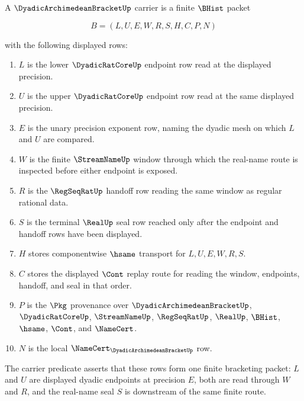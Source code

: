 \begin{definition}
\label{def:dyadic-archimedean-bracket-carrier}
A $\DyadicArchimedeanBracketUp$ carrier is a finite $\BHist$ packet

$$
B=(L,U,E,W,R,S,H,C,P,N)
$$

with the following displayed rows:
\begin{enumerate}
\item $L$ is the lower $\DyadicRatCoreUp$ endpoint row read at the displayed precision.
\item $U$ is the upper $\DyadicRatCoreUp$ endpoint row read at the same displayed precision.
\item $E$ is the unary precision exponent row, naming the dyadic mesh on which $L$ and $U$ are compared.
\item $W$ is the finite $\StreamNameUp$ window through which the real-name route is inspected before either endpoint is exposed.
\item $R$ is the $\RegSeqRatUp$ handoff row reading the same window as regular rational data.
\item $S$ is the terminal $\RealUp$ seal row reached only after the endpoint and handoff rows have been displayed.
\item $H$ stores componentwise $\hsame$ transport for $L,U,E,W,R,S$.
\item $C$ stores the displayed $\Cont$ replay route for reading the window, endpoints, handoff, and seal in that order.
\item $P$ is the $\Pkg$ provenance over $\DyadicArchimedeanBracketUp$, $\DyadicRatCoreUp$, $\StreamNameUp$, $\RegSeqRatUp$, $\RealUp$, $\BHist$, $\hsame$, $\Cont$, and $\NameCert$.
\item $N$ is the local $\NameCert_{\DyadicArchimedeanBracketUp}$ row.
\end{enumerate}
The carrier predicate asserts that these rows form one finite bracketing packet: $L$ and $U$ are displayed dyadic endpoints at precision $E$, both are read through $W$ and $R$, and the real-name seal $S$ is downstream of the same finite route.
\end{definition}

